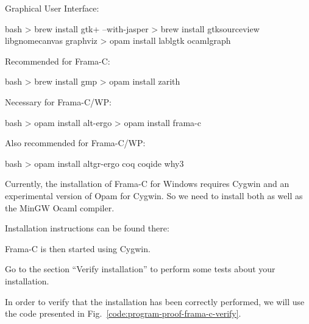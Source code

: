 Graphical User Interface:



\begin{CodeBlock}{bash}
> brew install gtk+ --with-jasper
> brew install gtksourceview libgnomecanvas graphviz
> opam install lablgtk ocamlgraph 
\end{CodeBlock}



Recommended for Frama-C:



\begin{CodeBlock}{bash}
> brew install gmp
> opam install zarith
\end{CodeBlock}



Necessary for Frama-C/WP:



\begin{CodeBlock}{bash}
> opam install alt-ergo
> opam install frama-c
\end{CodeBlock}



Also recommended for Frama-C/WP:



\begin{CodeBlock}{bash}
> opam install altgr-ergo coq coqide why3
\end{CodeBlock}



Currently, the installation of Frama-C for Windows requires Cygwin and
an experimental version of Opam for Cygwin. So we need to install both
as well as the MinGW Ocaml compiler.



Installation instructions can be found there:






Frama-C is then started using Cygwin.



Go to the section ``Verify installation'' to perform some tests about
your installation.






In order to verify that the installation has been correctly performed,
we will use the code presented in Fig.~\ref{code:program-proof-frama-c-verify}.



